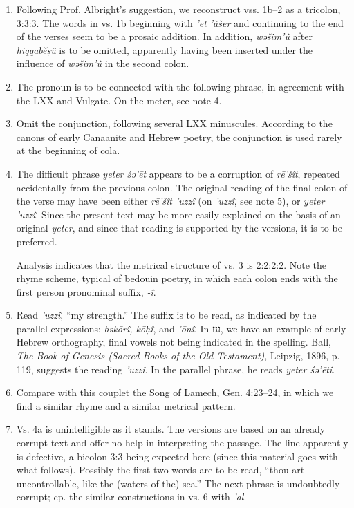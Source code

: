 \begin{enumerate}

\item
Following Prof. Albright's suggestion, we reconstruct vss. 1b--2 as a
tricolon, 3:3:3. The words in vs. 1b beginning with \emph{'ēt 'ăšer} and
continuing to the end of the verses seem to be a prosaic addition. In addition,
\emph{wəšim'û} after \emph{hiqqābĕṣû} is to be omitted, apparently having been
inserted under the influence of \emph{wəšim'û} in the second colon.

\item
The pronoun is to be connected with the following phrase, in agreement with
the LXX and Vulgate. On the meter, see note 4.

\item
Omit the conjunction, following several LXX minuscules. According to the
canons of early Canaanite and Hebrew poetry, the conjunction is used rarely at
the beginning of cola.

\item
The difficult phrase \emph{yeter śə'ēt} appears to be a corruption of
\emph{rē'šît}, repeated accidentally from the previous colon. The original
reading of the final colon of the verse may have been either \emph{rē'šît
'uzzî} (on \emph{'uzzî}, see note 5), or \emph{yeter 'uzzî}. Since the present
text may be more easily explained on the basis of an original \emph{yeter},
and since that reading is supported by the versions, it is to be preferred.

Analysis indicates that the metrical structure of vs. 3 is 2:2:2:2. Note the
rhyme scheme, typical of bedouin poetry, in which each colon ends with the
first person pronominal suffix, \emph{-î}.

\item
Read \emph{'uzzî}, ``my strength.'' The suffix is to be read, as indicated by
the parallel expressions: \emph{bəkōrî, kōḥî}, and \emph{'ōnî}. In עז, we
have an example of early Hebrew orthography, final vowels not being indicated
in the spelling. Ball, \emph{The Book of Genesis (Sacred Books of the Old
Testament)}, Leipzig, 1896, p. 119, suggests the reading \emph{'uzzî}. In the
parallel phrase, he reads \emph{yeter śə'ētî}.

\item
Compare with this couplet the Song of Lamech, Gen. 4:23--24, in which we find
a similar rhyme and a similar metrical pattern.

\item
Vs. 4a is unintelligible as it stands. The versions are based on an already
corrupt text and offer no help in interpreting the passage. The line apparently
is defective, a bicolon 3:3 being expected here (since this material goes with
what follows). Possibly the first two words are to be read, ``thou art
uncontrollable, like the (waters of the) sea.'' The next phrase is undoubtedly
corrupt; cp. the similar constructions in vs. 6 with \emph{'al}.


\end{enumerate}
